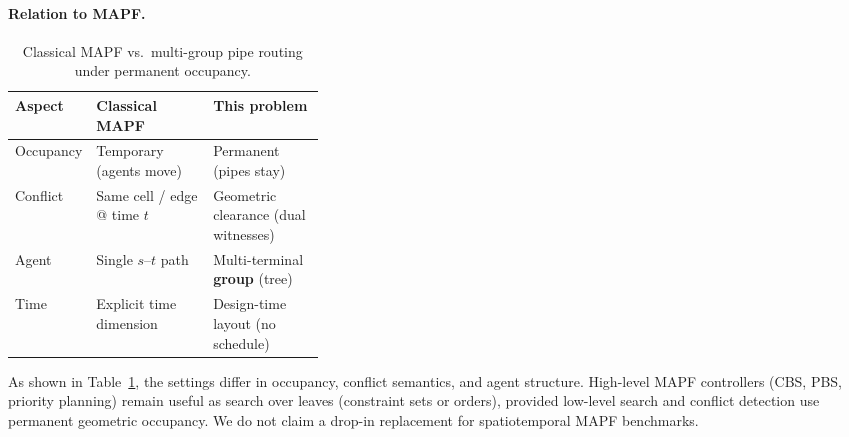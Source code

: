 \paragraph{Relation to MAPF.}
\begin{table}[htbp]
  \centering
  \caption{Classical MAPF vs.\ multi-group pipe routing under permanent
  occupancy.}
  \label{tab:vs-mapf}
  \begin{tabular}{@{}llp{0.36\linewidth}@{}}
    \toprule
    Aspect & Classical MAPF & This problem \\
    \midrule
    Occupancy & Temporary (agents move) & Permanent (pipes stay) \\
    Conflict & Same cell / edge @ time $t$ & Geometric clearance (dual witnesses) \\
    Agent & Single $s$--$t$ path & Multi-terminal \textbf{group} (tree) \\
    Time & Explicit time dimension & Design-time layout (no schedule) \\
    \bottomrule
  \end{tabular}
\end{table}
As shown in Table~\ref{tab:vs-mapf}, the settings differ in occupancy, conflict
semantics, and agent structure.
High-level MAPF controllers (CBS, PBS, priority planning) remain useful as
search over leaves (constraint sets or orders), provided low-level search and
conflict detection use permanent geometric occupancy.
We do not claim a drop-in replacement for spatiotemporal MAPF benchmarks.
